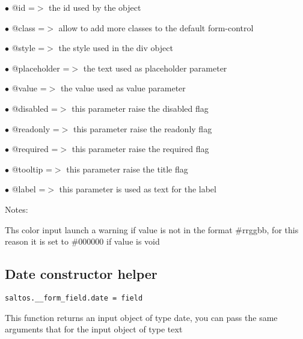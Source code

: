 \documentclass[a4paper]{book}
\begin{document}
\begin{compactitem}
\item[\color{myblue}$\bullet$] @id          =$>$ the id used by the object
\item[\color{myblue}$\bullet$] @class       =$>$ allow to add more classes to the default form-control
\item[\color{myblue}$\bullet$] @style       =$>$ the style used in the div object
\item[\color{myblue}$\bullet$] @placeholder =$>$ the text used as placeholder parameter
\item[\color{myblue}$\bullet$] @value       =$>$ the value used as value parameter
\item[\color{myblue}$\bullet$] @disabled    =$>$ this parameter raise the disabled flag
\item[\color{myblue}$\bullet$] @readonly    =$>$ this parameter raise the readonly flag
\item[\color{myblue}$\bullet$] @required    =$>$ this parameter raise the required flag
\item[\color{myblue}$\bullet$] @tooltip     =$>$ this parameter raise the title flag
\item[\color{myblue}$\bullet$] @label       =$>$ this parameter is used as text for the label
\end{compactitem}

Notes:

Ths color input launch a warning if value is not in the format \#rrggbb,
for this reason it is set to \#000000 if value is void

\hypertarget{toc379}{}
\subsection{Date constructor helper}

\begin{lstlisting}
saltos.__form_field.date = field
\end{lstlisting}

This function returns an input object of type date, you can pass the same arguments
that for the input object of type text
\end{document}
